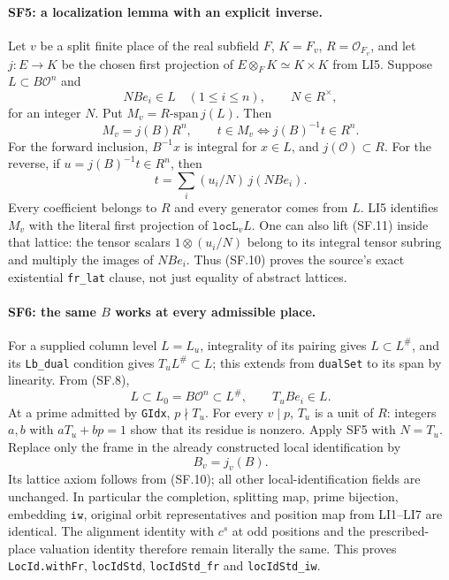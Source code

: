 \paragraph{SF5: a localization lemma with an explicit inverse.}
Let $v$ be a split finite place of the real subfield $F$,
$K=F_v$, $R=\mathcal O_{F_v}$, and let
$j:E\to K$ be the chosen first projection of
$E\otimes_FK\simeq K\times K$ from LI5.
Suppose $L\subset B\mathcal O^n$ and
\[
 N B e_i\in L\quad(1\le i\le n),\qquad N\in R^\times,
                                                               \tag{SF.9}
\]
for an integer $N$. Put $M_v=R\text{-span}\,j(L)$.
Then
\[
 M_v=j(B)R^n,\qquad
 t\in M_v\Longleftrightarrow j(B)^{-1}t\in R^n.         \tag{SF.10}
\]
For the forward inclusion, $B^{-1}x$ is integral for $x\in L$,
and $j(\mathcal O)\subset R$. For the reverse, if
$u=j(B)^{-1}t\in R^n$, then
\[
 t=\sum_i (u_i/N)\,j(NBe_i).                           \tag{SF.11}
\]
Every coefficient belongs to $R$ and every generator comes from $L$.
LI5 identifies $M_v$ with the literal first projection of
$\texttt{locL}_vL$. One can also lift (SF.11) inside that lattice:
the tensor scalars $1\otimes(u_i/N)$ belong to its integral tensor
subring and multiply the images of $NBe_i$. Thus (SF.10) proves the
source's exact existential \texttt{fr\_lat} clause, not just equality
of abstract lattices.

\paragraph{SF6: the same $B$ works at every admissible place.}
For a supplied column level $L=L_u$, integrality of its pairing gives
$L\subset L^\#$, and its \texttt{Lb\_dual} condition gives
$T_u L^\#\subset L$; this extends from \texttt{dualSet} to its span
by linearity. From (SF.8),
\[
 L\subset L_0=B\mathcal O^n\subset L^\#,
 \qquad T_uBe_i\in L.                                  \tag{SF.12}
\]
At a prime admitted by \texttt{GIdx}, $p\nmid T_u$. For every
$v\mid p$, $T_u$ is a unit of $R$: integers $a,b$ with
$aT_u+bp=1$ show that its residue is nonzero. Apply SF5 with $N=T_u$.
Replace only the frame in the already constructed local identification by
\[
 B_v=j_v(B).                                             \tag{SF.13}
\]
Its lattice axiom follows from (SF.10); all other local-identification
fields are unchanged. In particular the completion, splitting map,
prime bijection, embedding $\texttt{iw}$, original orbit representatives
and position map from LI1--LI7 are identical. The alignment identity
with $c^s$ at odd positions and the prescribed-place valuation identity
therefore remain literally the same. This proves
\texttt{LocId.withFr}, \texttt{locIdStd},
\texttt{locIdStd\_fr} and \texttt{locIdStd\_iw}.

